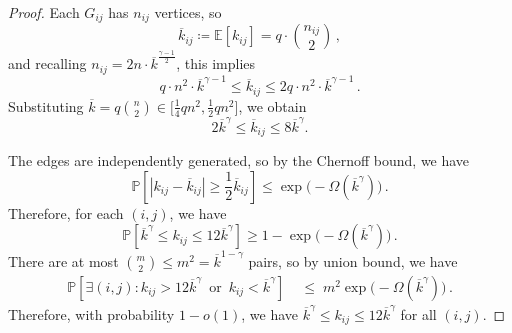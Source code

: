 \documentclass[journal]{IEEEtran}
\newtheorem{lemma}{Lemma}
\theoremstyle{definition}
\theoremstyle{definition}
\newcommand{\PP}{\mathbb{P}}
\newcommand{\PV}{\nu}
\newcommand{\kb}{\overline{k}}
\begin{document}
\begin{proof}
	Each $G_{ij}$ has $n_{ij}$ vertices, so
	\[
	\kb_{ij} \coloneqq \mathbb{E}[k_{ij}] = q \cdot \binom{n_{ij}}{2} \, ,
	\]
	and recalling $n_{ij} =2n \cdot \kb^{\frac{\gamma-1}{2}}$, this implies
	\[ 
	  q \cdot n^2 \cdot \kb^{\gamma-1}  \leq  \kb_{ij} \leq 2q \cdot n^2 \cdot \kb^{\gamma-1} \, .
	\]
	Substituting $ \kb = q \binom{n}{2} \in \big[\frac{1}{4}qn^2,\frac{1}{2}qn^2 \big]$, we obtain
	\begin{equation}
	   2\kb^{\gamma} \leq \kb_{ij} \leq 8\kb^{\gamma}. \label{eq:k_ij_bounds}
	\end{equation}
    
	The edges are independently generated, so by the Chernoff bound, we have
	\[
	\PP\left[ |k_{ij} - \kb_{ij}| \geq  \frac{1}{2} \kb_{ij} \right]
	\leq \exp \big( - \Omega(\kb^{\gamma}) \big)  \, .
	\]
	Therefore, for each $(i,j)$, we have
    \begin{equation}
       \label{eq:bound_edge_component}
       \PP[\kb^{\gamma} \leq k_{ij} \leq 12\kb^{\gamma}] \geq 1- \exp\big( -\Omega(\kb^{\gamma})\big) \,.
    \end{equation}
	There are at most $ \binom{m}{2} \leq m^2 =  \kb^{1-\gamma}$ pairs, so by union bound, we have 
    \begin{align*}
    \PP\left[ \exists (i,j): k_{ij} > 12\kb^{\gamma} 
       \,\text{ or }\, k_{ij}< \kb^{\gamma} \right] 
    &\;\le\; m^2 \exp\big(-\Omega(\kb^{\gamma})\big) \,.
\end{align*}
	Therefore, with probability $1 - o(1)$, we have $\kb^{\gamma} \leq k_{ij} \leq 12\kb^{\gamma}$ for all $(i,j)$.
\end{proof}




\end{document}
